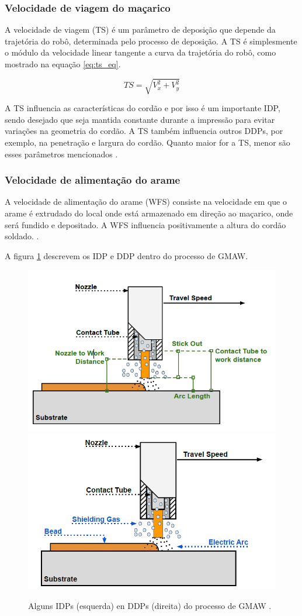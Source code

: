 \subsubsection{Velocidade de viagem do maçarico}
A velocidade de viagem (TS) é um parâmetro de deposição que depende da trajetória do robô, determinada pelo processo de deposição. A TS é simplesmente o módulo da velocidade linear tangente a curva da trajetória do robô, como mostrado na equação \ref{eq:ts_eq}. 

\begin{equation}
TS = \sqrt{V_x^2 + V_y^2}
\label{eq:ts_eq}
\end{equation}

A TS influencia as características do cordão e por isso é um importante IDP, sendo desejado que seja mantida constante durante a impressão para evitar variações na geometria do cordão. A TS também influencia outros DDPs, por exemplo, na penetração e largura do cordão. Quanto maior for a TS, menor são esses parâmetros mencionados \cite{ozcelik2003modeling}.

\subsubsection{Velocidade de alimentação do arame}
A velocidade de alimentação do arame (WFS) consiste na velocidade em que o arame é extrudado do local onde está armazenado em direção ao maçarico, onde será fundido e depositado. A WFS influencia positivamente a altura do cordão soldado. \cite{srivastava2023wire}.


A figura \ref{fig:gmaw_idp_ddp} descrevem os IDP e DDP dentro do processo de GMAW.
\begin{figure}[hbt!]
    \centering
    \includegraphics[width=0.46\linewidth]{Imagens/chap02/gmaw_idp.png}
    \includegraphics[width=0.46\linewidth]{Imagens/chap02/gmaw_ddp.png}
    \caption{Alguns IDPs (esquerda) en DDPs (direita) do processo de GMAW \cite{ozcelik2003modeling}.}
    \label{fig:gmaw_idp_ddp}
\end{figure}

